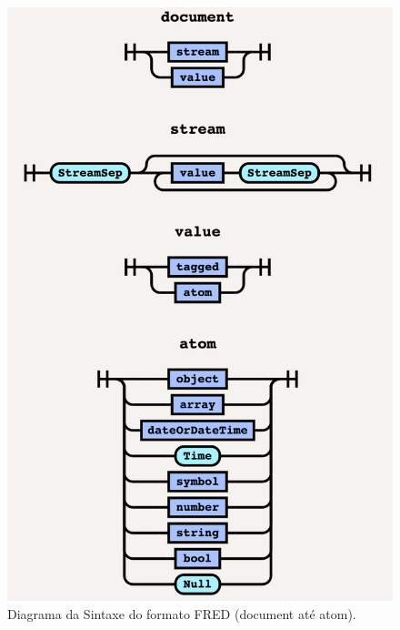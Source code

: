 \begin{apendicesenv}
\begin{figure}[H]
	\centering
	\includegraphics[keepaspectratio=true,scale=0.7]{figuras/syntaxdiagram1.png}
	\caption{Diagrama da Sintaxe do formato FRED (document até atom).}
\end{figure}


\end{apendicesenv}
